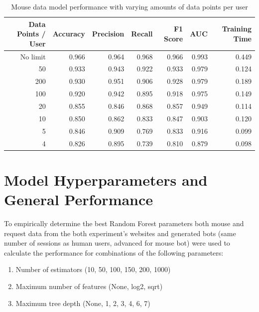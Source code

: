 \documentclass[
    fontsize=12pt,
    headings=small,
    parskip=half,           %
    bibliography=totoc,
    numbers=noenddot,       %
    open=any,               %
    final,                   %
    table
]{scrreprt}
\begin{document}
\begin{table}
    \begin{center}
        \begin{tabular}{rrrrrrr}
            \toprule
            Data Points / User & Accuracy & Precision & Recall & F1 Score & AUC & Training Time \\
            \midrule
            No limit & 0.966 & 0.964 & 0.968 & 0.966 & 0.993 & 0.449 \\
            50 & 0.933 & 0.943 & 0.922 & 0.933 & 0.979 & 0.124 \\
            200 & 0.930 & 0.951 & 0.906 & 0.928 & 0.979 & 0.189 \\
            100 & 0.920 & 0.942 & 0.895 & 0.918 & 0.975 & 0.149 \\
            20 & 0.855 & 0.846 & 0.868 & 0.857 & 0.949 & 0.114 \\
            10 & 0.850 & 0.862 & 0.833 & 0.847 & 0.903 & 0.120 \\
            5 & 0.846 & 0.909 & 0.769 & 0.833 & 0.916 & 0.099 \\
            4 & 0.826 & 0.895 & 0.739 & 0.810 & 0.879 & 0.098 \\
            \bottomrule
        \end{tabular}
    \end{center}
    \caption{Mouse data model performance with varying amounts of data points per user}
    \label{table:mouse_params_no_limit}
\end{table}


\section{Model Hyperparameters and General Performance}

To empirically determine the best Random Forest parameters both mouse and request data from the both experiment's websites and generated bots (same number of sessions as human users, advanced for mouse bot) were used to calculate the performance for combinations of the following parameters:

\begin{enumerate}
    \item Number of estimators (10, 50, 100, 150, 200, 1000)
    \item Maximum number of features (None, log2, sqrt)
    \item Maximum tree depth (None, 1, 2, 3, 4, 6, 7)
\end{enumerate}
\end{document}
